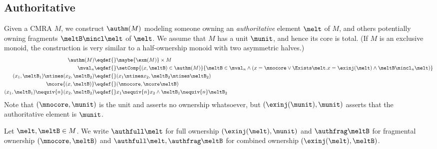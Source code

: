 


\subsection{Authoritative}
\label{sec:auth-cmra}

Given a CMRA $M$, we construct $\authm(M)$ modeling someone owning an \emph{authoritative} element $\melt$ of $M$, and others potentially owning fragments $\meltB \mincl \melt$ of $\melt$.
We assume that $M$ has a unit $\munit$, and hence its core is total.
(If $M$ is an exclusive monoid, the construction is very similar to a half-ownership monoid with two asymmetric halves.)
\begin{align*}
\authm(M) \eqdef{}& \maybe{\exm(M)} \times M \\
\mval_n \eqdef{}& \setComp{ (x, \meltB) \in \authm(M) }{ \meltB \in \mval_n \land (x = \mnocore \lor \Exists \melt. x = \exinj(\melt) \land \meltB \mincl_n \melt) } \\
  (x_1, \meltB_1) \mtimes (x_2, \meltB_2) \eqdef{}& (x_1 \mtimes x_2, \meltB_2 \mtimes \meltB_2) \\
  \mcore{(x, \meltB)} \eqdef{}& (\mnocore, \mcore\meltB) \\
  (x_1, \meltB_1) \nequiv{n} (x_2, \meltB_2) \eqdef{}& x_1 \nequiv{n} x_2 \land \meltB_1 \nequiv{n} \meltB_2
\end{align*}
Note that $(\mnocore, \munit)$ is the unit and asserts no ownership whatsoever, but $(\exinj(\munit), \munit)$ asserts that the authoritative element is $\munit$.

Let $\melt, \meltB \in M$.
We write $\authfull \melt$ for full ownership $(\exinj(\melt), \munit)$ and $\authfrag \meltB$ for fragmental ownership $(\mnocore, \meltB)$ and $\authfull \melt , \authfrag \meltB$ for combined ownership $(\exinj(\melt), \meltB)$.


